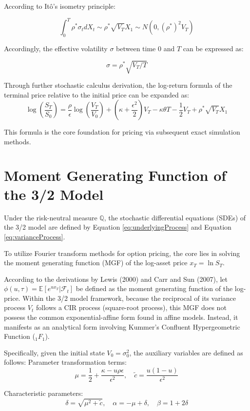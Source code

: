 According to Itô's isometry principle:

$$\int_0^T\rho^*\sigma_tdX_t\sim\rho^*\sqrt{V_T}X_1\sim N(0,(\rho^*)^2V_T)$$

Accordingly, the effective volatility $\sigma$ between time $0$ and $T$ can be expressed as:

$$\sigma=\rho^*\sqrt{V_T/T}$$

Through further stochastic calculus derivation, the log-return formula of the terminal price relative to the initial price can be expanded as:
\begin{equation}
    \log\left(\frac{S_T}{S_0}\right) = \frac{\rho}{\epsilon}\log\left(\frac{V_T}{V_0}\right) + \left(\kappa + \frac{\epsilon^2}{2}\right)V_T - \kappa\theta T - \frac{1}{2}V_T + \rho^* \sqrt{V_T} X_1
    \label{priceFormulaForConditionalMC}
\end{equation}

This formula is the core foundation for pricing via subsequent exact simulation methods.

\section{Moment Generating Function of the 3/2 Model}

Under the risk-neutral measure $\mathbb{Q}$, the stochastic differential equations (SDEs) of the 3/2 model are defined by Equation \eqref{eq:underlyingProcess} and Equation \eqref{eq:varianceProcess}.

To utilize Fourier transform methods for option pricing, the core lies in solving the moment generating function (MGF) of the log-asset price $x_T=\ln S_T$.

According to the derivations by Lewis (2000) and Carr and Sun (2007), let $\phi(u,\tau)=\mathbb{E}[e^{u x_T}|\mathcal{F}_t]$ be defined as the moment generating function of the log-price. Within the 3/2 model framework, because the reciprocal of its variance process $V_t$ follows a CIR process (square-root process), this MGF does not possess the common exponential-affine form found in affine models. Instead, it manifests as an analytical form involving Kummer's Confluent Hypergeometric Function ($_1F_1$).

Specifically, given the initial state $V_0=\sigma_0^2$, the auxiliary variables are defined as follows: Parameter transformation terms:
$$\mu=\frac{1}{2}+\frac{\kappa-u\rho\epsilon}{\epsilon^2},\quad\tilde{c}=\frac{u(1-u)}{\epsilon^2}$$

Characteristic parameters:
$$\delta=\sqrt{\mu^2+\tilde{c}},\quad\alpha=-\mu+\delta,\quad\beta=1+2\delta$$

